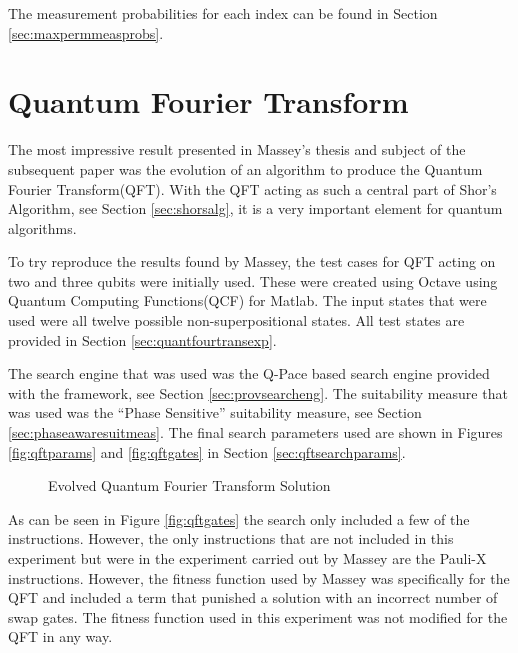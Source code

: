 The measurement probabilities for each index can be found in Section \ref{sec:maxpermmeasprobs}.



\section{Quantum Fourier Transform}
\label{sec:evoqft}

The most impressive result presented in Massey's thesis\cite{masseythesis} and subject of the subsequent paper\cite{Massey:2005:EHQ:1068009.1068288} was the evolution of an algorithm to produce the Quantum Fourier Transform(QFT).
With the QFT acting as such a central part of Shor's Algorithm, see Section \ref{sec:shorsalg}, it is a very important element for quantum algorithms.

To try reproduce the results found by Massey, the test cases for QFT acting on two and three qubits were initially used.
These were created using Octave\cite{octweb} using Quantum Computing Functions(QCF) for Matlab\cite{qcfweb}.
The input states that were used were all twelve possible non-superpositional states.
All test states are provided in Section \ref{sec:quantfourtransexp}.

The search engine that was used was the Q-Pace based search engine provided with the framework, see Section \ref{sec:provsearcheng}.
The suitability measure that was used was the ``Phase Sensitive'' suitability measure, see Section \ref{sec:phaseawaresuitmeas}.
The final search parameters used are shown in Figures \ref{fig:qftparams} and \ref{fig:qftgates} in Section \ref{sec:qftsearchparams}.

\begin{figure}
\caption{Evolved Quantum Fourier Transform Solution}
\label{fig:evoqftsol}
\end{figure}

As can be seen in Figure \ref{fig:qftgates} the search only included a few of the instructions.
However, the only instructions that are not included in this experiment but were in the experiment carried out by Massey are the Pauli-X instructions.
However, the fitness function used by Massey was specifically for the QFT and included a term that punished a solution with an incorrect number of swap gates.
The fitness function used in this experiment was not modified for the QFT in any way.


